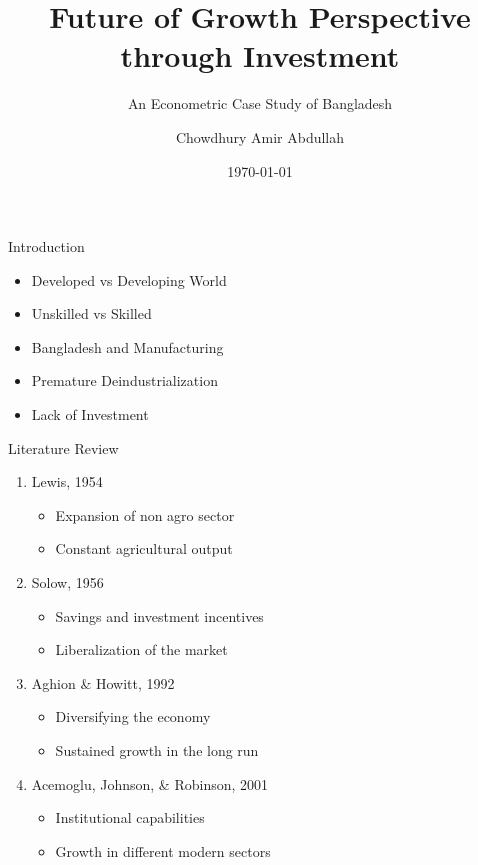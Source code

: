 \documentclass{beamer}
\title[Future of Growth Perspective
through Investment]{Future of Growth Perspective
through Investment}
\subtitle{An Econometric Case Study of Bangladesh}
\author{Chowdhury Amir Abdullah}
\institute{University of Dhaka}
\date{\today}
\begin{document}
\begin{frame}
\titlepage
\end{frame}



\begin{frame} {Introduction}

\begin{itemize}
\Large \item{Developed vs Developing World}
\Large \item{Unskilled vs Skilled}
\Large \item{Bangladesh and Manufacturing}
\Large \item{Premature Deindustrialization}
\Large \item{Lack of Investment}
\end{itemize}

\end{frame}



\begin{frame} {Literature Review}

\begin{enumerate}
\item Lewis, 1954
	\begin{itemize}
	\item Expansion of non agro sector
	\item Constant agricultural output
	\end{itemize}

\item Solow, 1956
	\begin{itemize}
	\item Savings and investment incentives
	\item Liberalization of the market
	\end{itemize}

\item Aghion \& Howitt, 1992
	\begin{itemize}
	\item Diversifying the economy
	\item Sustained growth in the long run
	\end{itemize}
	
\item Acemoglu, Johnson, \& Robinson, 2001
	\begin{itemize}
	\item Institutional capabilities
	\item Growth in different modern sectors
	\end{itemize}

\end{enumerate}

\end{frame}
\end{document}
